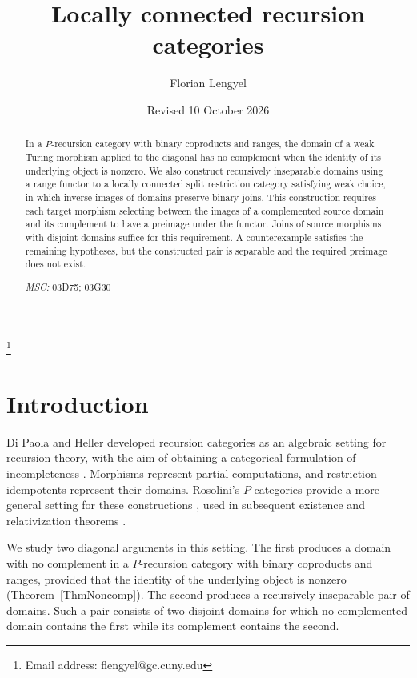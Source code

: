 \documentclass[letterpaper,10pt]{amsart}
\theoremstyle{plain}
\theoremstyle{definition}
\begin{document}
\title{Locally connected recursion categories}
\author{Florian Lengyel}
\date{Revised 10 October 2026}
\thanks{Email address: flengyel@gc.cuny.edu}
\address{The Graduate School and University Center, %
Ph.D Program in Computer Science, %
The City University of New York, 365 Fifth Avenue, New York, NY %
10016}

\begin{abstract}
In a $P$-recursion category with binary coproducts and ranges, the
domain of a weak Turing morphism applied to the diagonal has no
complement when the identity of its underlying object is nonzero.
We also construct recursively inseparable domains using a range functor
to a locally connected split restriction category satisfying weak
choice, in which inverse images of domains preserve binary joins.
This construction requires each target morphism selecting between the
images of a complemented source domain and its complement to have a preimage under
the functor. Joins of source morphisms with disjoint domains suffice
for this requirement. A counterexample satisfies the remaining
hypotheses, but the constructed pair is separable and the required
preimage does not exist.

\bigskip\noindent
{\it MSC:} 03D75; 03G30
\end{abstract}

\maketitle

\section{Introduction}
Di Paola and Heller developed recursion categories as an algebraic
setting for recursion theory, with the aim of obtaining a categorical
formulation of incompleteness \cite{MR88i:03078}. Morphisms represent
partial computations, and restriction idempotents represent their
domains. Rosolini's $P$-categories provide a more general setting for
these constructions \cite{coneit,MR90e:18001}, used in subsequent
existence and relativization theorems
\cite{MR92e:03067,MR95c:03110,leng}.

We study two diagonal arguments in this setting. The first produces a
domain with no complement in a $P$-recursion category with binary
coproducts and ranges, provided that the identity of the underlying
object is nonzero (Theorem~\ref{ThmNoncomp}). The second produces a
recursively inseparable pair of domains. Such a pair consists of two
disjoint domains for which no complemented domain contains the first
while its complement contains the second.
\end{document}
